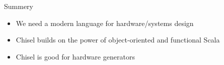 \documentclass[xcolor=pdflatex,dvipsnames,table]{beamer}
\begin{document}
\begin{frame}[fragile]{Summery}
\begin{itemize}
\item We need a modern language for hardware/systems design
\item Chisel builds on the power of object-oriented and functional Scala
\item Chisel is good for hardware generators
\end{itemize}
\end{frame}
\end{document}
